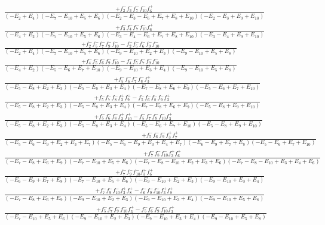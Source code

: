 \documentclass{article}
\begin{document}
\[\begin{array}{rcl}
\frac{+f_{2}^{-}f_{3}^{-}f_{7}^{-}f_{10}^{-}f_{6}^{+}}{(-E_{2}+E_{4})(-E_{7}-E_{10}+E_{5}+E_{6})(-E_{2}-E_{3}-E_{6}+E_{7}+E_{8}+E_{10})(-E_{2}-E_{3}+E_{9}+E_{10})}\\
\frac{+f_{3}^{-}f_{4}^{-}f_{7}^{-}f_{10}^{-}f_{6}^{+}}{(-E_{4}+E_{2})(-E_{7}-E_{10}+E_{5}+E_{6})(-E_{3}-E_{4}-E_{6}+E_{7}+E_{8}+E_{10})(-E_{3}-E_{4}+E_{9}+E_{10})}\\
\frac{+f_{2}^{-}f_{5}^{-}f_{7}^{-}f_{9}^{-}f_{10}^{-}-f_{2}^{-}f_{5}^{-}f_{6}^{-}f_{9}^{-}f_{10}^{-}}{(-E_{2}+E_{4})(-E_{7}-E_{10}+E_{5}+E_{6})(-E_{9}-E_{10}+E_{2}+E_{3})(-E_{9}-E_{10}+E_{5}+E_{8})}\\
\frac{+f_{4}^{-}f_{5}^{-}f_{6}^{-}f_{9}^{-}f_{10}^{-}-f_{4}^{-}f_{5}^{-}f_{7}^{-}f_{9}^{-}f_{10}^{-}}{(-E_{4}+E_{2})(-E_{5}-E_{6}+E_{7}+E_{10})(-E_{9}-E_{10}+E_{3}+E_{4})(-E_{9}-E_{10}+E_{5}+E_{8})}\\
\frac{+f_{5}^{-}f_{6}^{-}f_{7}^{-}f_{8}^{-}f_{3}^{+}}{(-E_{5}-E_{8}+E_{2}+E_{3})(-E_{5}-E_{8}+E_{3}+E_{4})(-E_{7}-E_{8}+E_{6}+E_{9})(-E_{5}-E_{6}+E_{7}+E_{10})}\\
\frac{+f_{5}^{-}f_{7}^{-}f_{8}^{-}f_{3}^{+}f_{9}^{+}-f_{5}^{-}f_{6}^{-}f_{8}^{-}f_{9}^{-}f_{3}^{+}}{(-E_{5}-E_{8}+E_{2}+E_{3})(-E_{5}-E_{8}+E_{3}+E_{4})(-E_{7}-E_{8}+E_{6}+E_{9})(-E_{5}-E_{8}+E_{9}+E_{10})}\\
\frac{+f_{5}^{-}f_{6}^{-}f_{8}^{-}f_{3}^{+}f_{10}^{+}-f_{5}^{-}f_{7}^{-}f_{8}^{-}f_{10}^{-}f_{3}^{+}}{(-E_{5}-E_{8}+E_{2}+E_{3})(-E_{5}-E_{8}+E_{3}+E_{4})(-E_{5}-E_{6}+E_{7}+E_{10})(-E_{5}-E_{8}+E_{9}+E_{10})}\\
\frac{+f_{5}^{-}f_{6}^{-}f_{9}^{-}f_{3}^{+}f_{7}^{+}}{(-E_{5}-E_{6}-E_{9}+E_{2}+E_{3}+E_{7})(-E_{5}-E_{6}-E_{9}+E_{3}+E_{4}+E_{7})(-E_{6}-E_{9}+E_{7}+E_{8})(-E_{5}-E_{6}+E_{7}+E_{10})}\\
\frac{+f_{7}^{-}f_{8}^{-}f_{10}^{-}f_{3}^{+}f_{6}^{+}}{(-E_{7}-E_{8}+E_{6}+E_{9})(-E_{7}-E_{10}+E_{5}+E_{6})(-E_{7}-E_{8}-E_{10}+E_{2}+E_{3}+E_{6})(-E_{7}-E_{8}-E_{10}+E_{3}+E_{4}+E_{6})}\\
\frac{+f_{7}^{-}f_{9}^{-}f_{10}^{-}f_{3}^{+}f_{6}^{+}}{(-E_{6}-E_{9}+E_{7}+E_{8})(-E_{7}-E_{10}+E_{5}+E_{6})(-E_{9}-E_{10}+E_{2}+E_{3})(-E_{9}-E_{10}+E_{3}+E_{4})}\\
\frac{+f_{7}^{-}f_{9}^{-}f_{10}^{-}f_{3}^{+}f_{8}^{+}-f_{6}^{-}f_{9}^{-}f_{10}^{-}f_{3}^{+}f_{8}^{+}}{(-E_{7}-E_{8}+E_{6}+E_{9})(-E_{9}-E_{10}+E_{2}+E_{3})(-E_{9}-E_{10}+E_{3}+E_{4})(-E_{9}-E_{10}+E_{5}+E_{8})}\\
\frac{+f_{5}^{-}f_{7}^{-}f_{9}^{-}f_{10}^{-}f_{3}^{+}-f_{5}^{-}f_{6}^{-}f_{9}^{-}f_{10}^{-}f_{3}^{+}}{(-E_{7}-E_{10}+E_{5}+E_{6})(-E_{9}-E_{10}+E_{2}+E_{3})(-E_{9}-E_{10}+E_{3}+E_{4})(-E_{9}-E_{10}+E_{5}+E_{8})}\\

\end{array}\]
\end{document}
